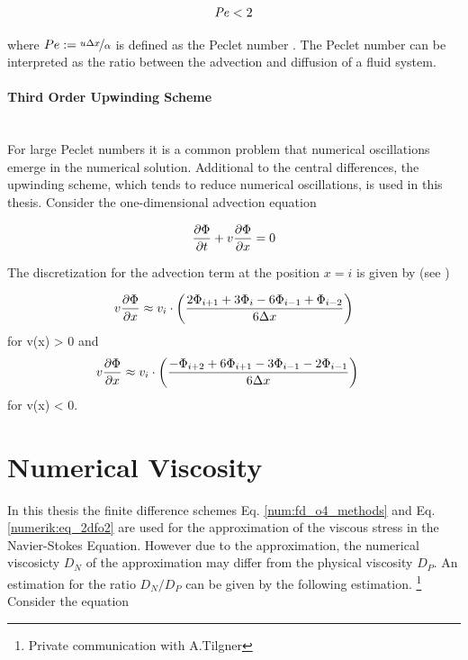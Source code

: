 \begin{align}
    \Pe  < 2
\end{align}

where $ Pe := \nicefrac{u \Delta x}{\alpha}$ is defined as the Peclet number \citep{ferziger99}.
The Peclet number can be interpreted as the ratio between the advection and diffusion of a fluid system.

\paragraph{Third Order Upwinding Scheme}\mbox{}\\

For large Peclet numbers it is a common problem that numerical oscillations emerge in the numerical solution.
Additional to the central differences, the upwinding scheme, which tends to reduce
numerical oscillations, is used in this thesis. Consider the one-dimensional advection equation

\begin{align}
    \pdn[\Phi]{t} + v\pdn[\Phi]{x} = 0
\end{align}

The discretization for the advection term at the position $x=i$ is given by (see \citep{FINDQUOTE})

\begin{align}
    v\pdn[\Phi]{x} &\approx  v_i \cdot \left(\frac{2\Phi_{i+1} + 3\Phi_i     - 6\Phi_{i-1} + \Phi_{i-2}}{6\Delta x}\right)\\
\end{align}
for v(x) > 0 and
\begin{align}
    v\pdn[\Phi]{x} &\approx  v_i \cdot \left( \frac{-\Phi_{i+2} + 6\Phi_{i+1} - 3\Phi_{i-1} - 2\Phi_{i-1}}{6\Delta x}\right)
\end{align}
for v(x) < 0.

\newpage

\section{Numerical Viscosity}

In this thesis the finite difference schemes Eq.  \ref{num:fd_o4_methods} and Eq.  \ref{numerik:eq_2dfo2}
are used for the approximation of the viscous stress in the Navier-Stokes Equation.
However due to the approximation, the numerical viscosicty $D_N$ of the approximation may differ from the physical viscosity $D_P$.
An estimation for the ratio $D_N/D_P$ can be given by the following estimation. \footnote{Private communication with A.Tilgner}
Consider the  equation

